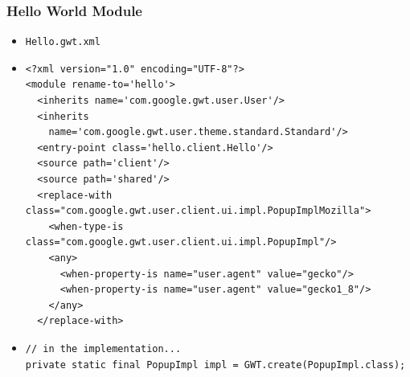 \documentclass[10pt,table, xcolor=pdflatex]{beamer}
\begin{document}
\begin{frame}[fragile]\frametitle{Hello World Module}
	\begin{itemize}
		\item[] \texttt{Hello.gwt.xml}
        \item[]
        	\lstset{language=XML, basicstyle=\footnotesize\ttfamily}
            \begin{lstlisting}
<?xml version="1.0" encoding="UTF-8"?>
<module rename-to='hello'>
  <inherits name='com.google.gwt.user.User'/>
  <inherits 
    name='com.google.gwt.user.theme.standard.Standard'/>
  <entry-point class='hello.client.Hello'/>
  <source path='client'/>
  <source path='shared'/>
  <replace-with class="com.google.gwt.user.client.ui.impl.PopupImplMozilla">
    <when-type-is class="com.google.gwt.user.client.ui.impl.PopupImpl"/>
    <any>
      <when-property-is name="user.agent" value="gecko"/>
      <when-property-is name="user.agent" value="gecko1_8"/>
    </any>
  </replace-with>
            \end{lstlisting}
        \item[]
        	\lstset{language=Java, basicstyle=\footnotesize\ttfamily}
            \begin{lstlisting}
// in the implementation...
private static final PopupImpl impl = GWT.create(PopupImpl.class);
            \end{lstlisting}
	\end{itemize}
\end{frame}
\end{document}
